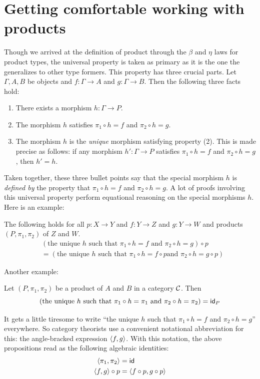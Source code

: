 \section{Getting comfortable working with products}

Though we arrived at the definition of product through the \(\beta\)
and \(\eta\) laws for product types,
the universal property is taken as primary
as it is the one the generalizes to other type formers.
This property has three crucial parts.
Let \(\Gamma,A,B\) be objects and \(f : \Gamma \to A\)
and \(g : \Gamma \to B\). Then the following three facts hold:
\begin{enumerate}
\item There exists a morphism \(h : \Gamma \to P\).
\item The morphism \(h\) satisfies \(\pi_1 \circ h = f\) and \(\pi_2 \circ h = g\).
\item The morphism \(h\) is the \emph{unique} morphism satisfying property (2).
  This is made precise as follows:
  if any morphism \(h' : \Gamma \to P\) satisfies \(\pi_1 \circ h = f\)
  and \(\pi_2 \circ h = g\), then \(h' = h\).
\end{enumerate}
Taken together, these three bullet points say that
the special morphism \(h\) is \emph{defined by}
the property that \(\pi_1 \circ h = f\) and \(\pi_2 \circ h = g\).
A lot of proofs involving this universal property
perform equational reasoning
on the special morphisms \(h\).
Here is an example:
\begin{proposition}
  The following holds for all \(p : X \to Y\)
  and \(f : Y \to Z\) and \(g : Y \to W\)
  and products \((P,\pi_1,\pi_2)\) of \(Z\) and \(W\).
  \begin{align*}
  &(\text{the unique \(h\) such that \(\pi_1\circ h = f\) and \(\pi_2 \circ h = g\)})
  \circ p
  \\
  &= (\text{the unique \(h\) such that \(\pi_1 \circ h = f \circ p\)
  and \(\pi_2 \circ h = g \circ p\)})
  \end{align*}
\end{proposition}
Another example:
\begin{proposition}
  Let \((P,\pi_1,\pi_2)\) be a product of \(A\) and \(B\)
  in a category \(\mathcal C\).
  Then
  \[
  (\text{the unique \(h\) such that \(\pi_1\circ h = \pi_1\)
  and \(\pi_2 \circ h = \pi_2\)})
  = \mathsf{id}_{P}
  \]
\end{proposition}
It gets a little tiresome to write ``the unique \(h\) such that \(\pi_1 \circ h = f\)
and \(\pi_2 \circ h = g\)'' everywhere.
So category theorists use a convenient notational abbreviation
for this: the angle-bracked expression \(\langle f,g\rangle\).
With this notation, the above propositions read as the following
algebraic identities:
\begin{align}
  \langle \pi_1,\pi_2\rangle &= \mathsf{id} \\
  \langle f,g\rangle\circ p &= \langle f\circ p, g \circ p\rangle
\end{align}

